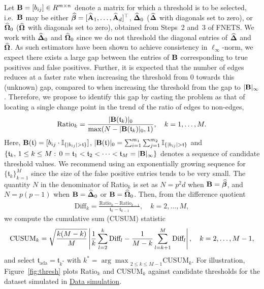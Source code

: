 Let $\mathbf B = [b_{ij}] \in R^{m \times n}$ denote a matrix for which a threshold is to be selected, i.e.\ $\mathbf B$ may be either $\widehat{\bm\beta} = [\widehat{\mathbf A}_1, \ldots, \widehat{\mathbf A}_d]^\top$, $\widehat{\bm\Delta}_0$ ($\widehat{\bm\Delta}$ with diagonals set to zero), or $\widehat{\bm\Omega}_0$ ($\widehat{\bm\Omega}$ with diagonals set to zero), obtained from Steps~2 and~3 of FNETS.
We work with $\widehat{\bm\Delta}_0$ and $\widehat{\bm\Omega}_0$ since we do not threshold the diagonal entries of $\widehat{\bm\Delta}$ and $\widehat{\bm\Omega}$.
As such estimators have been shown to achieve consistency in $\ell_\infty$-norm, we expect there exists a large gap between the entries of $\mathbf B$ corresponding to true positives and false positives.
Further, it is expected that the number of edges reduces at a faster rate when increasing the threshold from $0$ towards this (unknown) gap, compared to when increasing the threshold from the gap to $\vert \mathbf B \vert_\infty$.
Therefore, we propose to identify this gap by casting the problem as that of locating a single change point in the trend of the ratio of edges to non-edges,
\begin{align*}
\text{Ratio}_k = \frac{\vert \mathbf B(\mathfrak{t}_k) \vert_0}{ \max( N - \vert \mathbf B(\mathfrak{t}_k) \vert_0, 1) }, 
\quad k = 1, \dots, M.
\end{align*}
Here, $\mathbf B(\mathfrak{t}) = [b_{ij} \cdot \mathbb{I}_{\{\vert b_{ij} \vert > \mathfrak{t} \}}]$, 
$\vert \mathbf B(\mathfrak{t}) \vert_0 = \sum_{i = 1}^{m_1} \sum_{j = 1}^{m_2} \mathbb{I}_{\{\vert b_{ij} \vert > \mathfrak{t} \}}$
and $\{\mathfrak{t}_k, \, 1 \le k \le M: \, 0 = \mathfrak{t}_1 < \mathfrak{t}_2 < \dots < \mathfrak{t}_M = \vert \mathbf B \vert_\infty\}$ denotes a sequence of candidate threshold values.  
We recommend using an exponentially growing sequence for $\{\mathfrak{t}_k\}_{k = 1}^M$ since the size of the false positive entries tends to be very small.
The quantity $N$ in the denominator of Ratio$_k$ is set as $N = p^2d$ when $\mathbf B = \widehat{\bm\beta}$, and $N = p(p - 1)$ when $\mathbf B = \widehat{\bm\Delta}_0$ or $\mathbf B = \widehat{\bm\Omega}_0$.
Then, from the difference quotient
\begin{align*} 
\text{Diff}_k = \frac{\text{Ratio}_k - \text{Ratio}_{k - 1}}{\mathfrak{t}_k - \mathfrak{t}_{k - 1}},
\quad k = 2, \ldots, M,
\end{align*}
we compute the cumulative sum (CUSUM) statistic
\begin{align*}
\text{CUSUM}_k = \sqrt{\frac{k (M - k)}{M}} \left\vert \frac{1}{k} \sum_{l = 2}^k \text{Diff}_l - \frac{1}{M - k} \sum_{l = k + 1}^M \text{Diff}_l \right\vert, \quad k = 2, \ldots, M-1,
\end{align*}
and select $\mathfrak{t}_{\text{ada}} = \mathfrak{t}_{k^*}$ with $k^* = {\arg\max}_{2 \le k \le M - 1} \text{CUSUM}_k$.
For illustration, Figure~\ref{fig:thresh} plots Ratio$_k$ and CUSUM$_k$ against candidate thresholds for the dataset simulated in \hyperref[sec:package:data]{Data simulation}.


